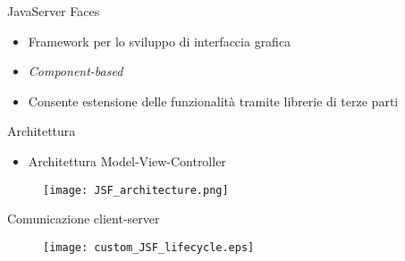 \begin{frame}{JavaServer Faces}

\begin{itemize}
\item Framework per lo sviluppo di interfaccia grafica
\item \textsl{Component-based}
\item Consente estensione delle funzionalità tramite librerie di terze parti
\end{itemize}

\end{frame}


\begin{frame}{Architettura}

\begin{itemize}
\item Architettura Model-View-Controller
\end{itemize}

\begin{figure}
	\centering
	\texttt{[image: JSF\_architecture.png]}
\end{figure}

\end{frame}


\begin{frame}{Comunicazione client-server}
\begin{figure}
	\centering
	\texttt{[image: custom\_JSF\_lifecycle.eps]}
\end{figure}

\end{frame}

























